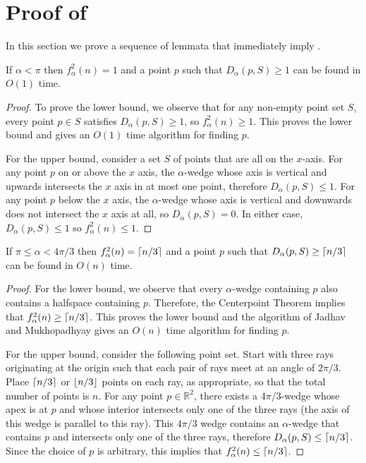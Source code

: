 \documentclass{dmtcs}
\newcommand{\R}{\mathbb{R}}
\begin{document}
\section{Proof of }

In this section we prove a sequence of lemmata that immediately imply
.

\begin{lem}
If $\alpha < \pi$ then $f^2_\alpha(n) = 1$ and a point $p$ such that
$D_\alpha(p,S)\ge 1$ can be found in $O(1)$ time.
\end{lem}

\begin{proof}
To prove the lower bound, we observe that for any non-empty
point set $S$, every point $p\in S$ satisfies $D_\alpha(p,S)\ge 1$, so
$f^2_\alpha(n) \ge 1$. This proves the lower bound and gives an $O(1)$
time algorithm for finding $p$. 

For the upper bound, consider a set $S$ of points that are all
on the $x$-axis.  For any point $p$ on or above the $x$ axis, the
$\alpha$-wedge whose axis is vertical and upwards intersects the $x$
axis in at most one point, therefore $D_\alpha(p,S) \le 1$.  For any
point $p$ below the $x$ axis, the $\alpha$-wedge whose axis is
vertical and downwards does not intersect the $x$ axis at all, so
$D_\alpha(p,S)=0$.  In either case, $D_\alpha(p,S)\le 1$ so $f^2_\alpha(n)
\le 1$.
\end{proof}

\begin{lem}
If $\pi\le \alpha < 4\pi/3$ then $f^2_\alpha(n) = \left\lceil n/3 \right\rceil$ and a
point $p$ such that $D_\alpha(p,S)\ge \left\lceil n/3 \right\rceil$ can be found in $O(n)$ time.
\end{lem}

\begin{proof} 
For the lower bound, we observe that every $\alpha$-wedge containing
$p$ also contains a halfspace containing $p$.  Therefore, the
Centerpoint Theorem implies that $f^2_\alpha(n) \ge \left\lceil n/3 \right\rceil$.  This
proves the lower bound and the algorithm of Jadhav and Mukhopadhyay
\cite{jm94} gives an $O(n)$ time algorithm for finding $p$.

For the upper bound, consider the following point set.  Start with
three rays originating at the origin such that each pair of rays meet at an
angle of $2\pi/3$.  Place $\left\lceil n/3 \right\rceil$ or $\left\lfloor n/3 \right\rfloor$ points on each
ray, as appropriate, so that the total number of points is $n$.  For
any point $p\in\R^2$, there exists a $4\pi/3$-wedge whose apex
is at $p$ and whose interior intersects only one of the three rays
(the axis of this wedge is parallel to this ray). This $4\pi/3$ wedge
contains an $\alpha$-wedge that contains $p$ and intersects only one
of the three rays, therefore $D_\alpha(p,S)\le \left\lceil n/3 \right\rceil$.  Since the
choice of $p$ is arbitrary, this implies that $f^2_\alpha(n) \le
\left\lceil n/3 \right\rceil$.  
\end{proof}
\end{document}
